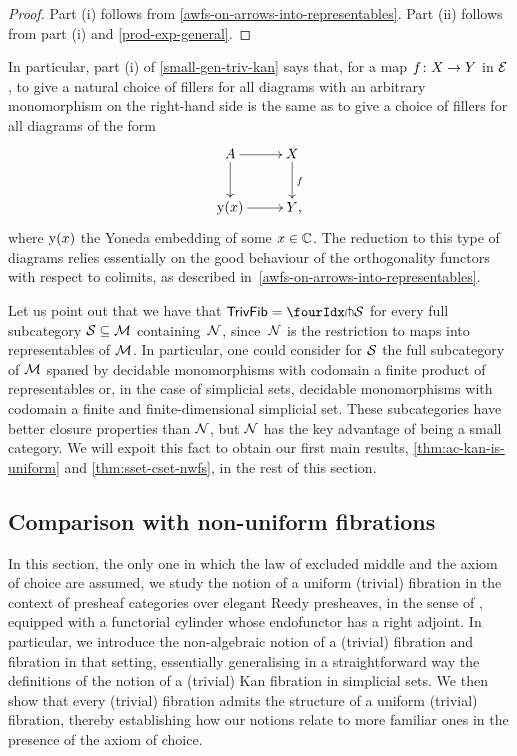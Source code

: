 \documentclass[reqno,10pt,a4paper,oneside,draft]{amsart}
\begin{document}
\begin{proof} Part (i) follows from \cref{awfs-on-arrows-into-representables}.
Part (ii) follows from part (i) and \cref{prod-exp-general}.
\end{proof}

In particular, part (i) of \cref{small-gen-triv-kan} says that, for a map $f \co X \to Y$ in $\catE$, to give a natural choice of fillers for all diagrams with an arbitrary monomorphism on the right-hand side is the same as to give a choice of fillers for all diagrams of the form
\[
\xymatrix{
A \ar[r] \ar[d] & X \ar[d]^f \\
\yon(x) \ar[r] & Y \rlap{,} }
\]
where $\yon(x)$ the Yoneda embedding of some $x \in \catC$.
The reduction to this type of diagrams relies essentially on the good behaviour of the orthogonality functors with respect to colimits, as described in~\cref{awfs-on-arrows-into-representables}.

\medskip

Let us point out that we have that $\TrivFib = \liftr{\cal{S}}$ for every full subcategory $\cal{S} \subseteq \cal{M}$ containing~$\cal{N}$, since~$\cal{N}$ is the restriction to maps into representables of $\cal{M}$.
In particular, one could consider for
$\cal{S}$ the full subcategory of $\cal{M}$ spaned by decidable monomorphisms with codomain a finite product of representables or, in the case of simplicial sets, decidable monomorphisms with codomain a finite and finite-dimensional simplicial set.
These subcategories have better closure properties than $\cal{N}$, but $\cal{N}$ has the key advantage of being a small category.
We will expoit this fact to obtain our first main results, \cref{thm:ac-kan-is-uniform} and \cref{thm:sset-cset-nwfs}, in the rest of this section.

\subsection*{Comparison with non-uniform fibrations}

In this section, the only one in which the law of excluded middle and the axiom of choice are assumed, we study the notion of a uniform (trivial) fibration in the context of presheaf categories over elegant Reedy presheaves, in the sense of \cite{bergner-rezk-elegant}, equipped with a functorial cylinder whose endofunctor has a right adjoint.
In particular, we introduce the non-algebraic notion of a (trivial) fibration and fibration in that setting, essentially generalising in a straightforward way the definitions of the notion of a (trivial) Kan fibration in simplicial sets.
We then show that every (trivial) fibration admits the structure of a uniform (trivial) fibration, thereby establishing how our notions relate to more familiar ones in the presence of the axiom of choice.
\end{document}
